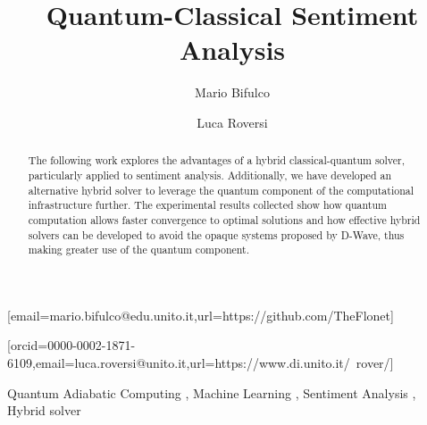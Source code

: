 \documentclass{ceurart}
\begin{document}
\title{Quantum-Classical Sentiment Analysis}
\author[1]{Mario Bifulco}[email=mario.bifulco@edu.unito.it,url=https://github.com/TheFlonet]
\author[1]{Luca Roversi}[orcid=0000-0002-1871-6109,email=luca.roversi@unito.it,url=https://www.di.unito.it/~rover/]
\address[1]{Università degli studi di Torino, Dipartimento di Informatica, Corso Svizzera 185 - 10149 Torino}

\begin{abstract}
    The following work explores the advantages of a hybrid classical-quantum solver, particularly applied to sentiment analysis. Additionally, we have developed an alternative hybrid solver to leverage the quantum component of the computational infrastructure further. 
    The experimental results collected show how quantum computation allows faster convergence to optimal solutions and how effective hybrid solvers can be developed to avoid the opaque systems proposed by D-Wave, thus making greater use of the quantum component.
\end{abstract}
\begin{keywords}
    Quantum Adiabatic Computing \sep 
    Machine Learning \sep
    Sentiment Analysis \sep 
    Hybrid solver 
\end{keywords}

\maketitle
\end{document}
